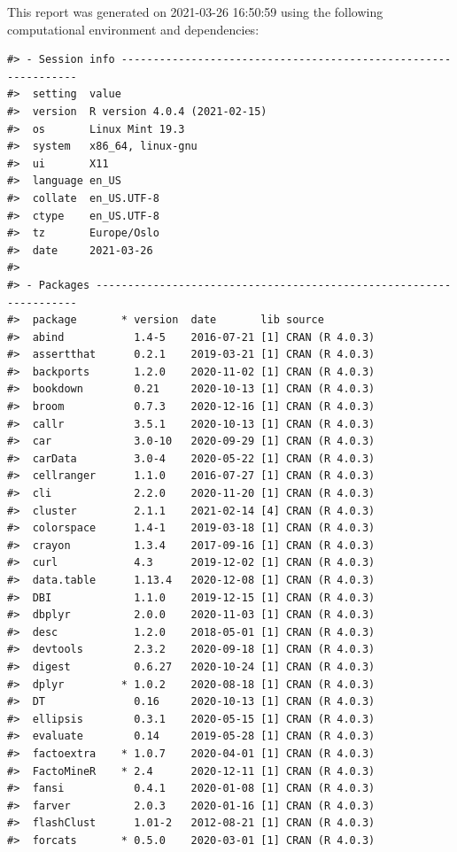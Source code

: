 \documentclass[
]{article}
\begin{document}
This report was generated on 2021-03-26 16:50:59 using the following computational environment and dependencies:

\begin{verbatim}
#> - Session info ---------------------------------------------------------------
#>  setting  value                       
#>  version  R version 4.0.4 (2021-02-15)
#>  os       Linux Mint 19.3             
#>  system   x86_64, linux-gnu           
#>  ui       X11                         
#>  language en_US                       
#>  collate  en_US.UTF-8                 
#>  ctype    en_US.UTF-8                 
#>  tz       Europe/Oslo                 
#>  date     2021-03-26                  
#> 
#> - Packages -------------------------------------------------------------------
#>  package       * version  date       lib source        
#>  abind           1.4-5    2016-07-21 [1] CRAN (R 4.0.3)
#>  assertthat      0.2.1    2019-03-21 [1] CRAN (R 4.0.3)
#>  backports       1.2.0    2020-11-02 [1] CRAN (R 4.0.3)
#>  bookdown        0.21     2020-10-13 [1] CRAN (R 4.0.3)
#>  broom           0.7.3    2020-12-16 [1] CRAN (R 4.0.3)
#>  callr           3.5.1    2020-10-13 [1] CRAN (R 4.0.3)
#>  car             3.0-10   2020-09-29 [1] CRAN (R 4.0.3)
#>  carData         3.0-4    2020-05-22 [1] CRAN (R 4.0.3)
#>  cellranger      1.1.0    2016-07-27 [1] CRAN (R 4.0.3)
#>  cli             2.2.0    2020-11-20 [1] CRAN (R 4.0.3)
#>  cluster         2.1.1    2021-02-14 [4] CRAN (R 4.0.3)
#>  colorspace      1.4-1    2019-03-18 [1] CRAN (R 4.0.3)
#>  crayon          1.3.4    2017-09-16 [1] CRAN (R 4.0.3)
#>  curl            4.3      2019-12-02 [1] CRAN (R 4.0.3)
#>  data.table      1.13.4   2020-12-08 [1] CRAN (R 4.0.3)
#>  DBI             1.1.0    2019-12-15 [1] CRAN (R 4.0.3)
#>  dbplyr          2.0.0    2020-11-03 [1] CRAN (R 4.0.3)
#>  desc            1.2.0    2018-05-01 [1] CRAN (R 4.0.3)
#>  devtools        2.3.2    2020-09-18 [1] CRAN (R 4.0.3)
#>  digest          0.6.27   2020-10-24 [1] CRAN (R 4.0.3)
#>  dplyr         * 1.0.2    2020-08-18 [1] CRAN (R 4.0.3)
#>  DT              0.16     2020-10-13 [1] CRAN (R 4.0.3)
#>  ellipsis        0.3.1    2020-05-15 [1] CRAN (R 4.0.3)
#>  evaluate        0.14     2019-05-28 [1] CRAN (R 4.0.3)
#>  factoextra    * 1.0.7    2020-04-01 [1] CRAN (R 4.0.3)
#>  FactoMineR    * 2.4      2020-12-11 [1] CRAN (R 4.0.3)
#>  fansi           0.4.1    2020-01-08 [1] CRAN (R 4.0.3)
#>  farver          2.0.3    2020-01-16 [1] CRAN (R 4.0.3)
#>  flashClust      1.01-2   2012-08-21 [1] CRAN (R 4.0.3)
#>  forcats       * 0.5.0    2020-03-01 [1] CRAN (R 4.0.3)

\end{verbatim}
\end{document}

